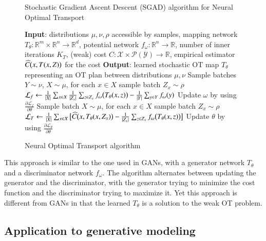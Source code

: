 \documentclass[11pt]{article}
\begin{document}
\begin{figure}[H]
    \begin{algorithm}[H]
        \caption{Stochastic Gradient Ascent Descent (SGAD) algorithm for Neural Optimal Transport}
        \begin{algorithmic}[1]
            \State \textbf{Input}: distributions $\mu,\nu,\rho$ accessible by samples, mapping network $T_{\theta}:\mathbb{R}^{m}\times\mathbb{R}^{n}\rightarrow\mathbb{R}^{d}$, potential network $f_{\omega}:\mathbb{R}^{n}\rightarrow\mathbb{R}$, number of inner iterations $K_{T}$, (weak) cost $C:\mathcal{X}\times\mathcal{P}(\mathcal{Y})\rightarrow\mathbb{R}$, empirical estimator $\widehat{C}\big{(}x,T(x,Z)\big{)}$ for the cost
            \State \textbf{Output}: learned stochastic OT map $T_{\theta}$ representing an OT plan between distributions $\mu,\nu$
            \Repeat
            \State Sample batches $Y\sim\nu$, $X\sim\mu$, for each $x\in X$ sample batch $Z_{x}\sim\rho$
            \State $\mathcal{L}_{f}\leftarrow\frac{1}{|X|}\sum_{x\in X}\frac{1}{|Z_{x}|}\sum_{z \in Z_{x}}f_{\omega}\big{(}T_{\theta}(x,z)\big{)}-\frac{1}{|Y|}\sum_{y\in Y}f_{ \omega}(y)$
            \State Update $\omega$ by using $\frac{\partial\mathcal{L}_{f}}{\partial\theta}$
            \State Sample batch $X\sim\mu$, for each $x\in X$ sample batch $Z_{x}\sim\rho$
            \State $\mathcal{L}_{T}\leftarrow\frac{1}{|X|}\sum_{x\in X}\big{[}\widehat{C}\big{(}x,T_{\theta}(x,Z_{x})\big{)}-\frac{1}{|Z_{x}|}\sum_{z\in Z_{x}}f_{\omega}\big{(} T_{\theta}(x,z)\big{)}\big{]}$
            \State Update $\theta$ by using $\frac{\partial\mathcal{L}_{\theta}}{\partial\theta}$
            \EndFor
        \end{algorithmic}
    \end{algorithm}
    \caption{Neural Optimal Transport algorithm \cite{korotin-2022}}
    \label{fig:sgad}
\end{figure}

This approach is similar to the one used in GANs, with a generator network $T_{\theta}$ and a discriminator network $f_{\omega}$. The algorithm alternates between updating the generator and the discriminator, with the generator trying to minimize the cost function and the discriminator trying to maximize it. Yet this approach is different from GANs in that the learned $T_{\theta}$ is a solution to the weak OT problem.

\subsection{Application to generative modeling}
\end{document}
